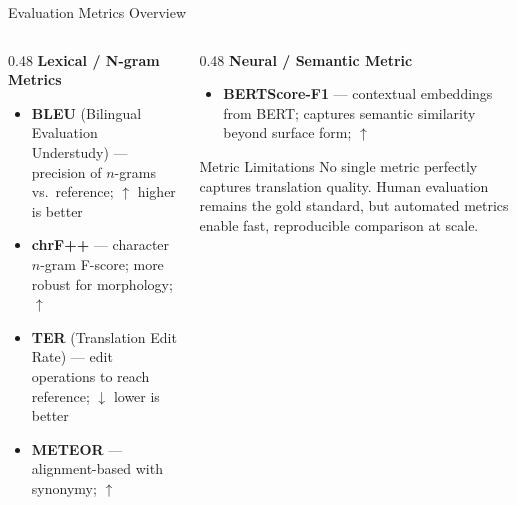 \documentclass{beamer}
\begin{document}
\begin{frame}{Evaluation Metrics Overview}
  \begin{columns}[T]
    \begin{column}{0.48\textwidth}
      \textbf{Lexical / N-gram Metrics}
      \vspace{0.2cm}
      \begin{itemize}
        \item \textbf{BLEU} (Bilingual Evaluation Understudy) --- precision of $n$-grams vs.\ reference; \textcolor{mtgreen}{$\uparrow$ higher is better}
        \item \textbf{chrF++} --- character $n$-gram F-score; more robust for morphology; \textcolor{mtgreen}{$\uparrow$}
        \item \textbf{TER} (Translation Edit Rate) --- edit operations to reach reference; \textcolor{mtred}{$\downarrow$ lower is better}
        \item \textbf{METEOR} --- alignment-based with synonymy; \textcolor{mtgreen}{$\uparrow$}
      \end{itemize}
    \end{column}
    \begin{column}{0.48\textwidth}
      \textbf{Neural / Semantic Metric}
      \vspace{0.2cm}
      \begin{itemize}
        \item \textbf{BERTScore-F1} --- contextual embeddings from BERT; captures semantic similarity beyond surface form; \textcolor{mtgreen}{$\uparrow$}
      \end{itemize}
      \vspace{0.4cm}
      \begin{alertblock}{Metric Limitations}
        No single metric perfectly captures translation quality. Human evaluation remains the gold standard, but automated metrics enable fast, reproducible comparison at scale.
      \end{alertblock}
    \end{column}
  \end{columns}
\end{frame}
\end{document}
